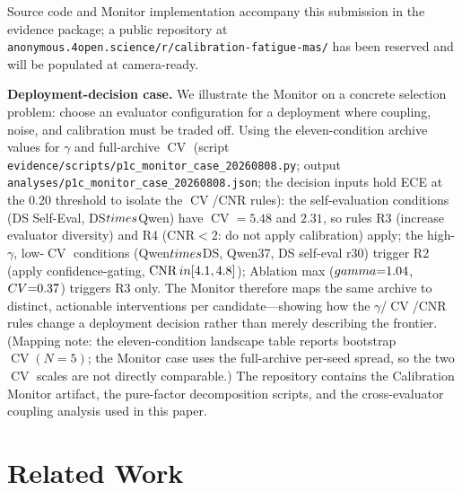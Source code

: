 \documentclass[11pt]{article}
\DeclareMathOperator{\CV}{CV}
\DeclareMathOperator{\CNR}{CNR}
\begin{document}
\noindent Source code and Monitor implementation accompany this submission in the evidence package; a public repository at \texttt{anonymous.4open.science/r/calibration-fatigue-mas/} has been reserved and will be populated at camera-ready.

\noindent\textbf{Deployment-decision case.} We illustrate the Monitor on a concrete selection problem: choose an evaluator configuration for a deployment where coupling, noise, and calibration must be traded off. Using the eleven-condition archive values for $\gamma$ and full-archive $\CV$ (script \texttt{evidence/scripts/p1c\_monitor\_case\_20260808.py}; output \texttt{analyses/p1c\_monitor\_case\_20260808.json}; the decision inputs hold ECE at the 0.20 threshold to isolate the $\CV$/CNR rules): the self-evaluation conditions (DS Self-Eval, DS$\\times$Qwen) have $\CV{=}5.48$ and $2.31$, so rules R3 (increase evaluator diversity) and R4 (CNR$<2$: do not apply calibration) apply; the high-$\gamma$, low-$\CV$ conditions (Qwen$\\times$DS, Qwen37, DS self-eval r30) trigger R2 (apply confidence-gating, $\CNR \\in [4.1, 4.8]$); Ablation max ($\\gamma{=}1.04$, $\\CV{=}0.37$) triggers R3 only. The Monitor therefore maps the same archive to distinct, actionable interventions per candidate---showing how the $\gamma$/$\CV$/CNR rules change a deployment decision rather than merely describing the frontier. (Mapping note: the eleven-condition landscape table reports bootstrap $\CV(N{=}5)$; the Monitor case uses the full-archive per-seed spread, so the two $\CV$ scales are not directly comparable.)
The repository contains the Calibration Monitor artifact, the pure-factor decomposition scripts, and the cross-evaluator coupling analysis used in this paper.


\section{Related Work}
\end{document}
